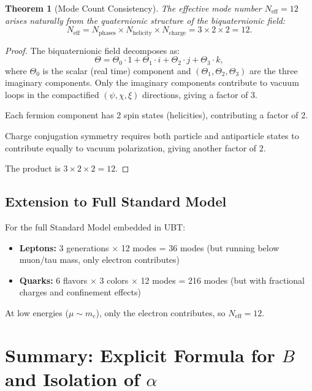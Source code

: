 \documentclass[11pt,a4paper]{article}
\newtheorem{theorem}{Theorem}
\theoremstyle{remark}
\begin{document}
\begin{theorem}[Mode Count Consistency]
The effective mode number $N_{\text{eff}} = 12$ arises naturally from the quaternionic structure of the biquaternionic field:
\begin{equation}
N_{\text{eff}} = N_{\text{phases}} \times N_{\text{helicity}} \times N_{\text{charge}} = 3 \times 2 \times 2 = 12.
\label{eq:Neff}
\end{equation}
\end{theorem}

\begin{proof}
The biquaternionic field decomposes as:
\begin{equation}
\Theta = \Theta_0 \cdot 1 + \Theta_1 \cdot i + \Theta_2 \cdot j + \Theta_3 \cdot k,
\end{equation}
where $\Theta_0$ is the scalar (real time) component and $(\Theta_1, \Theta_2, \Theta_3)$ are the three imaginary components. Only the imaginary components contribute to vacuum loops in the compactified $(\psi, \chi, \xi)$ directions, giving a factor of 3.

Each fermion component has 2 spin states (helicities), contributing a factor of 2.

Charge conjugation symmetry requires both particle and antiparticle states to contribute equally to vacuum polarization, giving another factor of 2.

The product is $3 \times 2 \times 2 = 12$.
\end{proof}

\subsection{Extension to Full Standard Model}

For the full Standard Model embedded in UBT:
\begin{itemize}
\item \textbf{Leptons:} 3 generations $\times$ 12 modes = 36 modes (but running below muon/tau mass, only electron contributes)
\item \textbf{Quarks:} 6 flavors $\times$ 3 colors $\times$ 12 modes = 216 modes (but with fractional charges and confinement effects)
\end{itemize}

At low energies ($\mu \sim m_e$), only the electron contributes, so $N_{\text{eff}} = 12$.

\section{Summary: Explicit Formula for $B$ and Isolation of $\alpha$}
\label{sec:B-formula}
\end{document}
